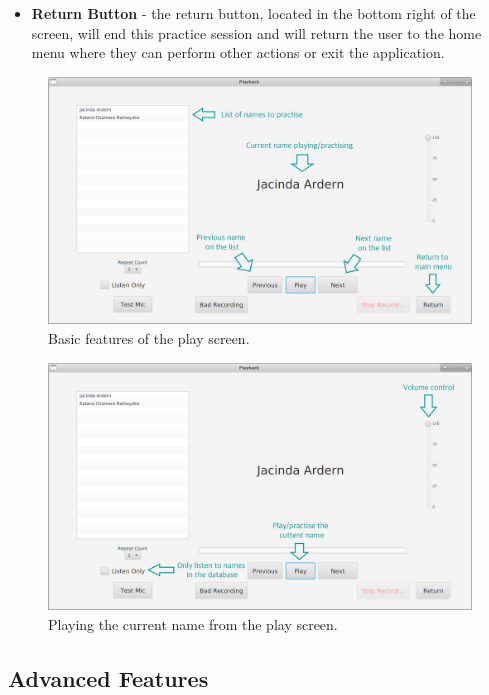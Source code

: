 \documentclass{article}
\begin{document}
\begin{itemize}
	\item \textbf{Return Button} - the return button, located in the bottom
	right of the screen, will end this practice session and will return the user
	to the home menu where they can perform other actions or exit the
	application.

\end{itemize}

\begin{figure}[H]
	\includegraphics[width=\textwidth]{images/8_practice_nav.jpg}
	\caption{Basic features of the play screen.}
	\label{practicenav}
\end{figure}

\begin{figure}[H]
	\includegraphics[width=\textwidth]{images/9_practice_play.jpg}
	\caption{Playing the current name from the play screen.}
	\label{practiceplay}
\end{figure}

\subsection{Advanced Features}
\end{document}
